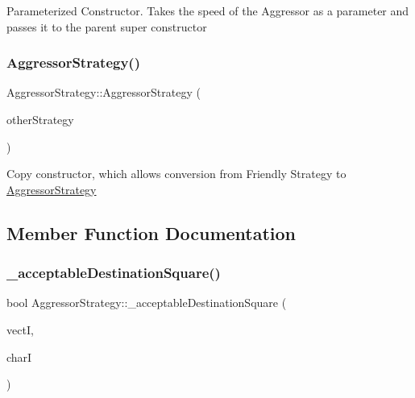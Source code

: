 Parameterized Constructor. Takes the speed of the Aggressor as a parameter and passes it to the parent super constructor \hypertarget{class_aggressor_strategy_a28ff17baf09805d74c4a970287382930}{}\label{class_aggressor_strategy_a28ff17baf09805d74c4a970287382930} 
\subsubsection{\texorpdfstring{Aggressor\+Strategy()}{AggressorStrategy()}\hspace{0.1cm}{\footnotesize\ttfamily [2/2]}}
{\footnotesize\ttfamily Aggressor\+Strategy\+::\+Aggressor\+Strategy (\begin{DoxyParamCaption}\item[{\hyperlink{class_friendly_strategy}{Friendly\+Strategy} $\ast$}]{other\+Strategy }\end{DoxyParamCaption})}

Copy constructor, which allows conversion from Friendly Strategy to \hyperlink{class_aggressor_strategy}{Aggressor\+Strategy} 

\subsection{Member Function Documentation}
\hypertarget{class_aggressor_strategy_a2bda41203cace4fbdbcb6a05bfd5243d}{}\label{class_aggressor_strategy_a2bda41203cace4fbdbcb6a05bfd5243d} 
\subsubsection{\texorpdfstring{\+\_\+acceptable\+Destination\+Square()}{\_acceptableDestinationSquare()}}
{\footnotesize\ttfamily bool Aggressor\+Strategy\+::\+\_\+acceptable\+Destination\+Square (\begin{DoxyParamCaption}\item[{int}]{vectI,  }\item[{int}]{charI }\end{DoxyParamCaption})\hspace{0.3cm}{\ttfamily [virtual]}}

